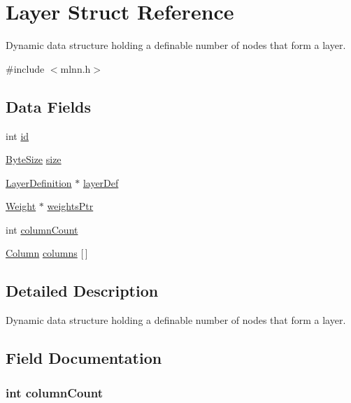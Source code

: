 \hypertarget{struct_layer}{}\section{Layer Struct Reference}
\label{struct_layer}


Dynamic data structure holding a definable number of nodes that form a layer.  




{\ttfamily \#include $<$mlnn.\+h$>$}

\subsection*{Data Fields}
\begin{DoxyCompactItemize}
\item 
int \hyperlink{struct_layer_a7441ef0865bcb3db9b8064dd7375c1ea}{id}
\item 
\hyperlink{mlnn_8h_a7a4b57eb083e961719b18441711d8ee5}{Byte\+Size} \hyperlink{struct_layer_aab34baa6cb3e7bebfb7f4ba88a0ffbda}{size}
\item 
\hyperlink{struct_layer_definition}{Layer\+Definition} $\ast$ \hyperlink{struct_layer_afd960456640bc70ae4e7a5eb92e25457}{layer\+Def}
\item 
\hyperlink{mlnn_8h_a5b53e5716aeadbb040a52c9c8c124c74}{Weight} $\ast$ \hyperlink{struct_layer_aba0c89d93d01078126869da17a931b5b}{weights\+Ptr}
\item 
int \hyperlink{struct_layer_a0e92795928d8e6908e0ffe6c8ec2c214}{column\+Count}
\item 
\hyperlink{struct_column}{Column} \hyperlink{struct_layer_ab534c9bc589a82a94c47661c9422f52a}{columns} \mbox{[}$\,$\mbox{]}
\end{DoxyCompactItemize}


\subsection{Detailed Description}
Dynamic data structure holding a definable number of nodes that form a layer. 

\subsection{Field Documentation}
\hypertarget{struct_layer_a0e92795928d8e6908e0ffe6c8ec2c214}{}
\subsubsection[{column\+Count}]{\setlength{\rightskip}{0pt plus 5cm}int column\+Count}\label{struct_layer_a0e92795928d8e6908e0ffe6c8ec2c214}
\hypertarget{struct_layer_ab534c9bc589a82a94c47661c9422f52a}{}
